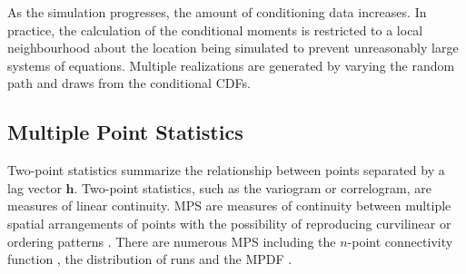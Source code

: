 As the simulation progresses, the amount of conditioning data increases. In practice, the calculation of the conditional moments is restricted to a local neighbourhood about the location being simulated to prevent unreasonably large systems of equations. Multiple realizations are generated by varying the random path and draws from the conditional \glspl{CDF}.






\subsection{Multiple Point Statistics}
\label{subsec:01mps}

Two-point statistics summarize the relationship between points separated by a lag vector $\mathbf{h}$. Two-point statistics, such as the variogram or correlogram, are measures of linear continuity. \Gls{MPS} are measures of continuity between multiple spatial arrangements of points with the possibility of reproducing curvilinear or ordering patterns \citep{boisvert2007multiplepoint}. There are numerous \gls{MPS} including the $n$-point connectivity function \citep{journel1989nongaussian}, the distribution of runs \citep{ortiz2003characterization} and the \gls{MPDF} \citep{boisvert2007multiplepoint}.

